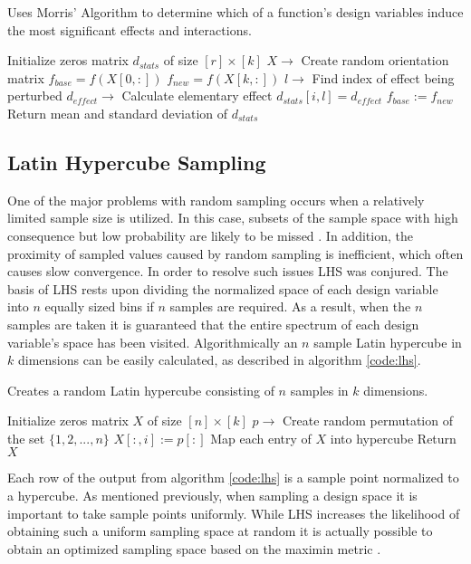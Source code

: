\begin{algorithm}
\caption{\label{code:morris_algorithm} 
Uses Morris' Algorithm to determine which of a function's design variables induce the most significant effects and interactions.} 
\begin{algorithmic}[1]
\State Initialize zeros matrix $d_{stats}$ of size $[r]\times[k]$
   \State $X\rightarrow$ Create random orientation matrix 
   \State $f_{base} = f(X[0,:])$
      \State $f_{new} = f(X[k,:])$
      \State $l\rightarrow$ Find index of effect being perturbed
      \State $d_{effect}\rightarrow$ Calculate elementary effect  
      \State $d_{stats}[i,l] = d_{effect}$
      \State $f_{base} := f_{new}$
   \EndFor
\EndFor
\State Return mean and standard deviation of $d_{stats}$ 
\end{algorithmic}
\end{algorithm}

\subsection{Latin Hypercube Sampling}
\label{subsec:lhs}

One of the major problems with random sampling occurs when a relatively limited sample size is utilized. In this case, subsets of the sample space with high consequence but low probability are likely to be missed \cite{Helton}. In addition, the proximity of sampled values caused by random sampling is inefficient, which often causes slow convergence. In order to resolve such issues \ac{LHS} was conjured. The basis of \ac{LHS} rests upon dividing the normalized space of each design variable into $n$ equally sized bins if $n$ samples are required. As a result, when the $n$ samples are taken it is guaranteed that the entire spectrum of each design variable's space has been visited. Algorithmically an $n$ sample Latin hypercube in $k$ dimensions can be easily calculated, as described in algorithm \ref{code:lhs}.

\begin{algorithm}
\caption{\label{code:lhs} 
Creates a random Latin hypercube consisting of $n$ samples in $k$ dimensions.} 
\begin{algorithmic}[1]
\State Initialize zeros matrix $X$ of size $[n]\times[k]$
   \State $p\rightarrow$ Create random permutation of the set $\lbrace 1,2,...,n\rbrace$ 
   \State $X[:,i] := p[:]$
\EndFor
\State Map each entry of $X$ into hypercube
\State Return $X$ 
\end{algorithmic}
\end{algorithm}

Each row of the output from algorithm \ref{code:lhs} is a sample point normalized to a hypercube. As mentioned previously, when sampling a design space it is important to take sample points uniformly. While \ac{LHS} increases the likelihood of obtaining such a uniform sampling space at random it is actually possible to obtain an optimized sampling space based on the maximin metric \cite{Forrester}.    


 

